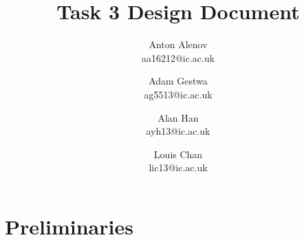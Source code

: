 \documentclass[11pt]{article}
\begin{document}
\title{Task 3 Design Document}
\author{Anton Alenov\\aa16212@ic.ac.uk \and Adam Gestwa\\ag5513@ic.ac.uk \and Alan Han\\ayh13@ic.ac.uk \and Louis Chan\\lic13@ic.ac.uk}

\maketitle

\section*{Preliminaries}


\newpage

\newpage

\end{document}
